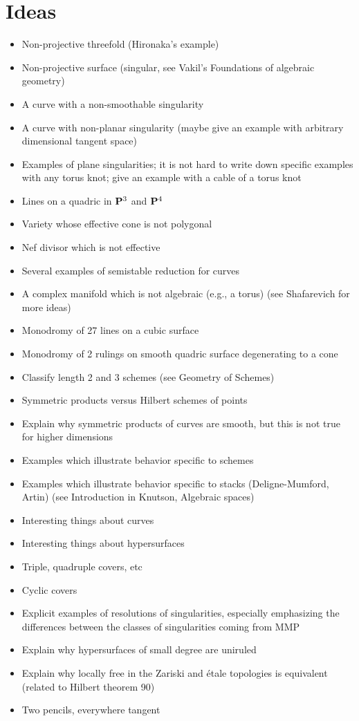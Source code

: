 \chapter{Ideas}

\begin{itemize}
\item Non-projective threefold (Hironaka's example)
\item Non-projective surface (singular, see Vakil's Foundations of algebraic geometry)
\item A curve with a non-smoothable singularity
\item A curve with non-planar singularity (maybe give an example with arbitrary dimensional tangent space)
\item Examples of plane singularities; it is not hard to write down specific examples with any torus knot; give an example with a cable of a torus knot
\item Lines on a quadric in $\mathbf{P}^3$ and $\mathbf{P}^4$
\item Variety whose effective cone is not polygonal
\item Nef divisor which is not effective
\item Several examples of semistable reduction for curves
\item A complex manifold which is not algebraic (e.g., a torus) (see Shafarevich for more ideas)
\item Monodromy of 27 lines on a cubic surface
\item Monodromy of 2 rulings on smooth quadric surface degenerating to a cone
\item Classify length 2 and 3 schemes (see Geometry of Schemes)
\item Symmetric products versus Hilbert schemes of points
\item Explain why symmetric products of curves are smooth, but this is not true for higher dimensions
\item Examples which illustrate behavior specific to schemes
\item Examples which illustrate behavior specific to stacks (Deligne-Mumford, Artin) (see Introduction in Knutson, Algebraic spaces)
\item Interesting things about curves
\item Interesting things about hypersurfaces
\item Triple, quadruple covers, etc
\item Cyclic covers
\item Explicit examples of resolutions of singularities, especially emphasizing the differences between the classes of singularities coming from MMP
\item Explain why hypersurfaces of small degree are uniruled
\item Explain why locally free in the Zariski and \'etale topologies is equivalent (related to Hilbert theorem 90)
\item Two pencils, everywhere tangent
\end{itemize}

